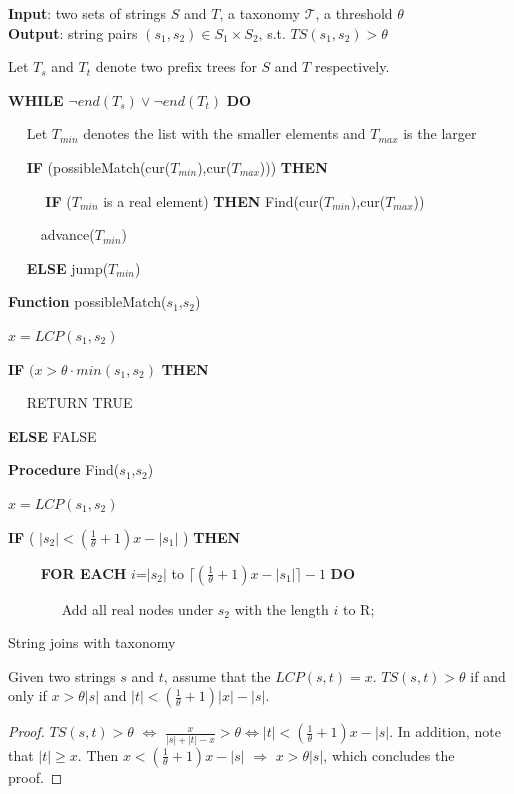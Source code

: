 \begin{algorithm}
{\bf Input}: two sets of strings $S$ and $T$, a taxonomy $\mathcal{T}$, a threshold $\theta$ \\
{\bf Output}: string pairs $(s_1,s_2) \in S_1 \times S_2$, s.t. $TS(s_1, s_2) > \theta$
\begin{compactenum}[(1)]
\item Let $T_s$ and $T_t$ denote two prefix trees for $S$ and $T$ respectively.
\item {\bf WHILE} $\neg end(T_s) \vee \neg end(T_t)$ {\bf DO}
\item ~~ Let $T_{min}$ denotes the list with the smaller elements and $T_{max}$ is the larger
\item  ~~ {\bf IF} (possibleMatch(cur($T_{min}$),cur($T_{max}$))) {\bf THEN}
\item ~~ ~~ {\bf  IF} ($T_{min}$ is a real element)   {\bf THEN} Find(cur($T_{min})$,cur($T_{max}$))
 \item ~~~~ advance($T_{min}$)
 \item ~~ {\bf ELSE} jump($T_{min}$)
\end{compactenum}
\smallskip
\textbf{Function} possibleMatch($s_1$,$s_2$)
\begin{compactenum}[(1)]
\item  $x = LCP(s_1,s_2)$
\item {\bf IF}  $(x > \theta \cdot min (s_1, s_2 )$  {\bf THEN}
\item  ~~ RETURN TRUE
\item   {\bf ELSE} FALSE
\end{compactenum}
\smallskip
\textbf{Procedure} Find($s_1$,$s_2$)
\begin{compactenum}[(1)]
\item  $x = LCP(s_1,s_2) $
\item {\bf IF} ( $|s_2| < (\frac{1}{\theta}+1)x-|s_1|$ ) {\bf THEN}
\item ~~~~ {\bf FOR EACH} $i$=$|s_2|$ to $ \lceil (\frac{1}{\theta}+1)x-|s_1| \rceil -1 $ {\bf DO}
\item ~~~~~~~ Add all real nodes under $s_2$ with the length $i$ to R;
\end{compactenum}
\caption{String joins with taxonomy}
\label{alg:exactjoin}
\end{algorithm}


\begin{lem} Given two strings $s$ and $t$,  assume that the $LCP(s,t) = x$. $TS(s,t) > \theta$ if and only if  $ x > \theta |s| $ and $  |t| < (\frac{1}{\theta}+1)|x|-|s|$.
\end{lem}
\begin{proof}  $TS(s,t) > \theta$ $\Leftrightarrow$ $\frac{x}{|s|+|t|-x} > \theta \Leftrightarrow |t| < (\frac{1}{\theta}+1)x-|s|$. In addition, note that $|t| \geq x$. Then $x < (\frac{1}{\theta}+1)x-|s|$ $\Rightarrow$ $x > \theta |s| $, which concludes the proof.
\end{proof}


